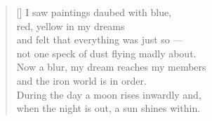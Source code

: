 \documentclass[a4paper,12pt,twoside,final]{book}
\begin{document}
\newpage


\settowidth{\versewidth}{Now a blur, my dream reaches my members}

\begin{verse}[\versewidth]
  I saw paintings daubed with blue, \\
  red, yellow in my dreams \\
  and felt that everything was just so ---\\
  not one speck of dust flying madly about. \\
  Now a blur, my dream reaches my members \\
  and the iron world is in order. \\
  During the day a moon rises inwardly and, \\
  when the night is out, a sun shines within.
\end{verse}

\newpage

\settowidth{\versewidth}{Nappal hold kél bennem s ha kinn van}
\end{document}

